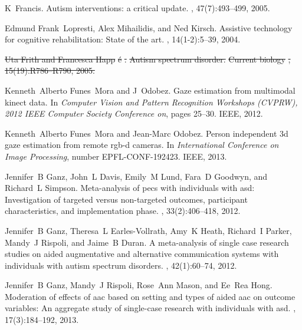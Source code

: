 \documentclass{ut-thesis}
\providecommand{\DIFdeltex}[1]{{\protect\color{red}\sout{#1}}}                      %
\providecommand{\DIFdelbegin}{} %
\providecommand{\DIFdelend}{} %
\providecommand{\DIFdel}[1]{\texorpdfstring{\DIFdeltex{#1}}{}} %
\begin{document}
\begin{thebibliography}{100}
K~Francis.
\newblock Autism interventions: a critical update.
, 47(7):493--499,
  2005.

Edmund Frank~Lopresti, Alex Mihailidis, and Ned Kirsch.
\newblock Assistive technology for cognitive rehabilitation: State of the art.
, 14(1-2):5--39, 2004.

\DIFdelbegin %
\DIFdel{Uta Frith and Francesca Happ}%
\DIFdel{\'e}%
\DIFdel{.
}%
\DIFdel{Autism spectrum disorder.
}%
\DIFdel{Current biology}%
\DIFdel{, 15(19):R786--R790, 2005.
}%

\DIFdelend {}
Kenneth~Alberto Funes~Mora and J~Odobez.
\newblock Gaze estimation from multimodal kinect data.
\newblock In {\em Computer Vision and Pattern Recognition Workshops (CVPRW),
  2012 IEEE Computer Society Conference on}, pages 25--30. IEEE, 2012.

Kenneth~Alberto Funes~Mora and Jean-Marc Odobez.
\newblock Person independent 3d gaze estimation from remote rgb-d cameras.
\newblock In {\em International Conference on Image Processing}, number
  EPFL-CONF-192423. IEEE, 2013.

Jennifer~B Ganz, John~L Davis, Emily~M Lund, Fara~D Goodwyn, and Richard~L
  Simpson.
\newblock Meta-analysis of pecs with individuals with asd: Investigation of
  targeted versus non-targeted outcomes, participant characteristics, and
  implementation phase.
, 33(2):406--418, 2012.

Jennifer~B Ganz, Theresa~L Earles-Vollrath, Amy~K Heath, Richard~I Parker,
  Mandy~J Rispoli, and Jaime~B Duran.
\newblock A meta-analysis of single case research studies on aided augmentative
  and alternative communication systems with individuals with autism spectrum
  disorders.
, 42(1):60--74,
  2012.

Jennifer~B Ganz, Mandy~J Rispoli, Rose~Ann Mason, and Ee~Rea Hong.
\newblock Moderation of effects of aac based on setting and types of aided aac
  on outcome variables: An aggregate study of single-case research with
  individuals with asd.
, 17(3):184--192, 2013.


\end{thebibliography}
\end{document}
